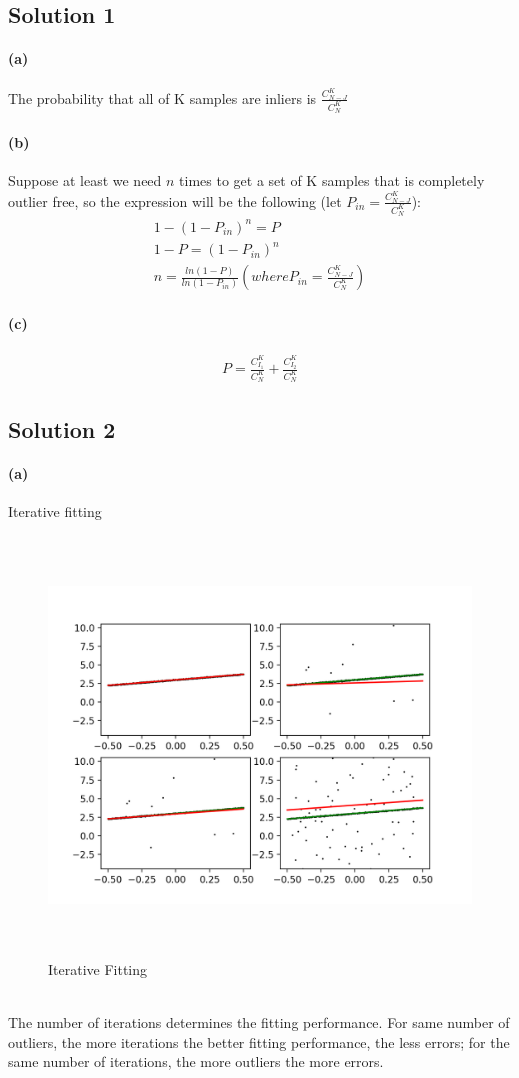 \documentclass{article}
\newcommand{\solution}[1]{\clearpage \subsection*{Solution #1}}  %
\newcommand{\spart}[1]{\paragraph{(#1)}}
\begin{document}

\solution{1}

\spart{a} 
The probability that all of K samples are inliers is $\frac{C^K_{N-J}}{C^K_{N}}$
\spart{b} 
Suppose at least we need $n$ times to get a set of K samples that is completely outlier free, so the expression will be the following (let $P_{in} = \frac{C^K_{N-J}}{C^K_{N}}$): 
\begin{align}
	1 - \left(1-P_{in}\right)^{n} = P\\
	1 - P = \left(1-P_{in}\right)^{n}\\
	n = \frac{ln\left(1-P\right)}{ln\left(1-P_{in}\right)}  \left(where P_{in} = \frac{C^K_{N-J}}{C^K_{N}}\right)
\end{align}

\spart{c} 

\begin{align}
	P = \frac{C^K_{I_1}}{C^K_{N}} + \frac{C^K_{I_2}}{C^K_{N}}
\end{align}


\solution{2}

\spart{a}
Iterative fitting
\begin{figure}[h!]
  \centering
	\includegraphics[height=30em]{code/outputs/prob2a.png}
	  \caption{Iterative Fitting}
\end{figure}
\\
The number of iterations determines the fitting performance. For same number of outliers, the more iterations the better fitting performance, the less errors; for the same number of iterations, the more outliers the more errors.
\end{document}
